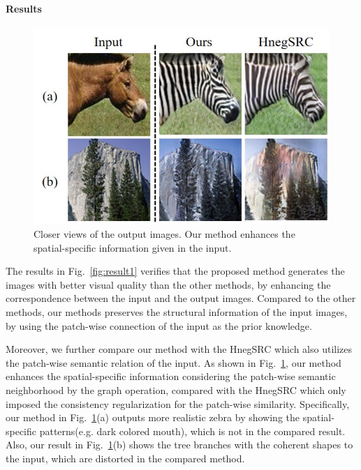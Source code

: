 \documentclass[letterpaper]{article} %
\begin{document}
\paragraph{Results}
\begin{figure}[!t]
	\centering
	\includegraphics[width=0.85\columnwidth]{figs/spatial_specific_2.jpg}
	\caption{Closer views of the output images. Our method enhances the spatial-specific information given in the input.}
	\label{fig:spatial_specific}
\end{figure}


The results in Fig.~\ref{fig:result1} verifies that the proposed method generates the images with better visual quality than the other methods, by enhancing the correspondence between the input and the output images. Compared to the other methods, our methods preserves the structural information of the input images, by using the patch-wise connection of the input as the prior knowledge.

Moreover, we further compare our method with the HnegSRC which also utilizes the patch-wise semantic relation of the input. As shown in Fig.~\ref{fig:spatial_specific}, our method enhances the spatial-specific information considering the patch-wise semantic neighborhood by the graph operation, compared with the HnegSRC which only imposed the consistency regularization for the patch-wise similarity. Specifically, our method in Fig.~\ref{fig:spatial_specific}(a) outputs more realistic zebra by showing the spatial-specific patterns(e.g. dark colored mouth), which is not in the compared result. Also, our result in Fig.~\ref{fig:spatial_specific}(b) shows the tree branches with the coherent shapes to the input, which are distorted in the compared method.
\end{document}
